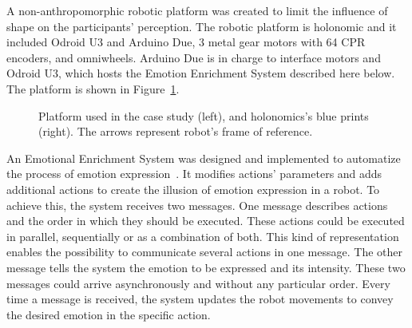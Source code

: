 A non-anthropomorphic robotic platform was created to limit the influence of shape on the participants' perception. The robotic platform is holonomic and it included Odroid U3 and Arduino Due, 3 metal gear motors with 64 CPR encoders, and omniwheels. Arduino Due is in charge to interface motors and Odroid U3, which hosts the Emotion Enrichment System described here below.
The platform is shown in Figure~\ref{fig:Robot}.

\begin{figure}[t]
\centering%
\hspace{2mm}
\caption{Platform used in the case study (left), and holonomics's blue prints (right). The arrows represent robot's frame of reference.
\label{fig:Robot}}
\end{figure}

An Emotional Enrichment System was designed and implemented to automatize the process of emotion expression~\cite{Angel2017}. It modifies actions' parameters and adds additional actions to create the illusion of emotion expression in a robot. To achieve this, the system receives two messages. One message describes actions and the order in which they should be executed. These actions could be executed in parallel, sequentially or as a combination of both. This kind of representation enables the possibility to communicate several actions in one message. The other message tells the system the emotion to be expressed and its intensity. These two messages could arrive asynchronously and without any particular order. Every time a message is received, the system updates the robot movements to convey the desired emotion in the specific action.
